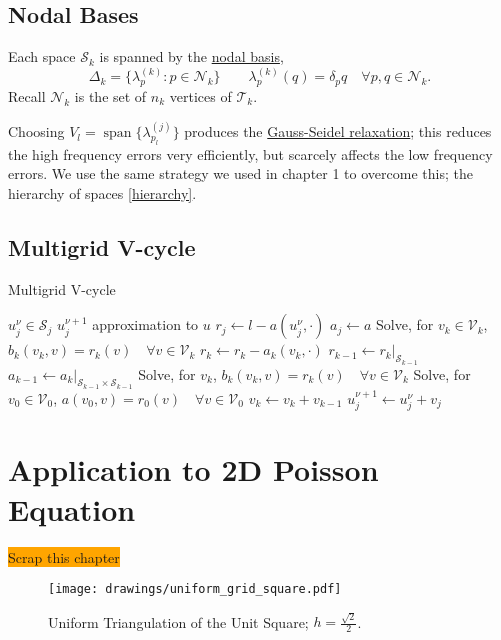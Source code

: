 \documentclass[a4paper,10pt,oneside]{book}
\theoremstyle{plain}%
\theoremstyle{definition}
\theoremstyle{remark}
\DeclareMathOperator{\spn}{span}
\newcommand{\calS}{\mathcal{S}}
\newcommand{\calT}{\mathcal{T}}
\newcommand{\calV}{\mathcal{V}}
\newcommand{\calN}{\mathcal{N}}
\begin{document}
\section{Nodal Bases}
Each space $\calS_k$ is spanned by the \underline{nodal basis},
\begin{equation}
 \Delta_k = \{\lambda_p^{(k)} :
p\in\calN_k\}\qquad\lambda_p^{(k)}(q)=\delta_pq\quad\forall p,q\in\calN_k.
\end{equation}
Recall $\calN_k$ is the set of $n_k$ vertices of $\calT_k$.

Choosing $V_l=\spn\{\lambda_{p_l}^{(j)}\}$ produces the
\underline{Gauss-Seidel relaxation}; this reduces the high frequency errors
very efficiently, but scarcely affects the low frequency errors. We use the
same strategy we used in chapter 1 to overcome this; the hierarchy of spaces
\eqref{hierarchy}.

\section{Multigrid V-cycle}
\begin{algorithm}
 \caption{Multigrid V-cycle}
 \begin{algorithmic}
  \REQUIRE $u^\nu_j\in\calS_j$
  \ENSURE $u_j^{\nu+1}$ approximation to $u$
  \STATE $r_j\gets l-a(u^\nu_j, \cdot)$
  \STATE $a_j\gets a$
    \STATE Solve, for $v_k\in\calV_k$, $b_k(v_k,v) = r_k(v)\quad\forall
v\in\calV_k$ 
    \STATE $r_k \gets r_k - a_k(v_k,\cdot)$ 
    \STATE $r_{k-1} \gets r_k|_{\calS_{k-1}}$ 
    \STATE $a_{k-1} \gets a_k|_{\calS_{k-1}\times\calS_{k-1}}$
    \STATE Solve, for $v_k$, $b_k(v_k,v) = r_k(v)\quad\forall
v\in\calV_k$ 
  \ENDFOR
  \STATE Solve, for $v_0\in\calV_0$, $a(v_0,v)=r_0(v)\quad\forall
v\in\calV_0$ 
    \STATE $v_k\gets v_k+v_{k-1}$
  \ENDFOR
  \STATE $u_j^{\nu+1}\gets u^\nu_j+v_j$
 \end{algorithmic}
\end{algorithm}



\chapter{Application to 2D Poisson Equation}
\colorbox{orange}{Scrap this chapter}
\begin{figure}
 \centering
 \texttt{[image: drawings/uniform\_grid\_square.pdf]}
 \caption{Uniform Triangulation of the Unit Square; $h=\frac{\sqrt{2}}{2}$.}
\end{figure}
\end{document}
